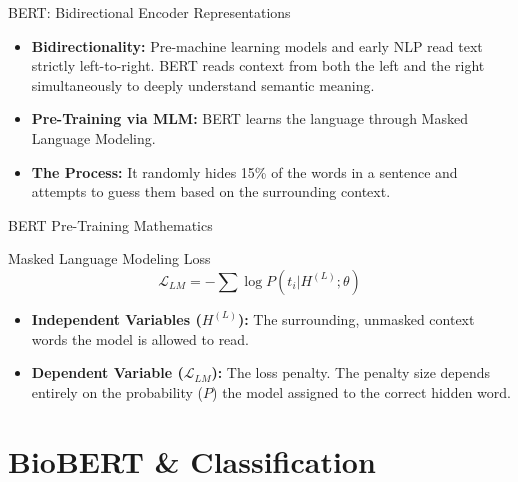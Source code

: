 \documentclass[10pt,aspectratio=169]{beamer}
\begin{document}
	\begin{frame}{BERT: Bidirectional Encoder Representations}
		\begin{itemize}
			\item \textbf{Bidirectionality:} Pre-machine learning models and early NLP read text strictly left-to-right. BERT reads context from both the left and the right simultaneously to deeply understand semantic meaning.
			\item \textbf{Pre-Training via MLM:} BERT learns the language through Masked Language Modeling. 
			\item \textbf{The Process:} It randomly hides 15\% of the words in a sentence and attempts to guess them based on the surrounding context.
		\end{itemize}
	\end{frame}
	
	\begin{frame}{BERT Pre-Training Mathematics}
		\begin{block}{Masked Language Modeling Loss}
			\[ \mathcal{L}_{LM} = -\sum \log P(t_i | H^{(L)}; \theta) \]
		\end{block}
		\vspace{0.5cm}
		\begin{itemize}
			\item \textbf{Independent Variables ($H^{(L)}$):} The surrounding, unmasked context words the model is allowed to read.
			\item \textbf{Dependent Variable ($\mathcal{L}_{LM}$):} The loss penalty. The penalty size depends entirely on the probability ($P$) the model assigned to the correct hidden word.
		\end{itemize}
	\end{frame}
	
	\section{BioBERT \& Classification}
\end{document}
